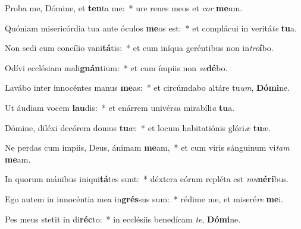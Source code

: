 \item Proba me, Dómine, et \textbf{ten}ta me:~* ure renes meos et \textit{cor} \textbf{me}um.
\item Quóniam misericórdia tua ante óculos \textbf{me}os est:~* et complácui in veritá\textit{te} \textbf{tu}a.
\item Non sedi cum concílio vani\textbf{tá}tis:~* et cum iníqua geréntibus non in\textit{tro}\textbf{í}bo.
\item Odívi ecclésiam mali\textbf{gnán}tium:~* et cum ímpiis non \textit{se}\textbf{dé}bo.
\item Lavábo inter innocéntes manus \textbf{me}as:~* et circúmdabo altáre tu\textit{um}, \textbf{Dó}\textbf{mi}ne.
\item Ut áudiam vocem \textbf{lau}dis:~* et enárrem univérsa mirabíli\textit{a} \textbf{tu}a.
\item Dómine, diléxi decórem domus \textbf{tu}æ:~* et locum habitatiónis glóri\textit{æ} \textbf{tu}æ.
\item Ne perdas cum ímpiis, Deus, ánimam \textbf{me}am,~* et cum viris sánguinum vi\textit{tam} \textbf{me}am.
\item In quorum mánibus iniqui\textbf{tá}tes sunt:~* déxtera eórum repléta est \textit{mu}\textbf{né}\textbf{ri}bus.
\item Ego autem in innocéntia mea in\textbf{grés}sus sum:~* rédime me, et miseré\textit{re} \textbf{me}i.
\item Pes meus stetit in di\textbf{réc}to:~* in ecclésiis benedícam \textit{te}, \textbf{Dó}\textbf{mi}ne.
